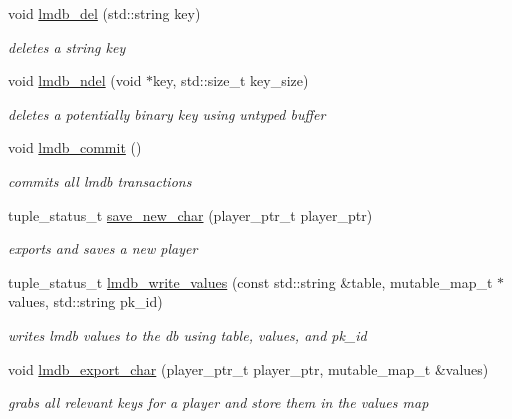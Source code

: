 \begin{DoxyCompactItemize}
void \hyperlink{namespacemods_1_1db_a5fbce517ac53231aa35c7d9c58622ce2}{lmdb\+\_\+del} (std\+::string key)
\begin{DoxyCompactList}\small\item\em deletes a string key \end{DoxyCompactList}\item 
void \hyperlink{namespacemods_1_1db_af13cbeaf36d1892265aca37289d5c7cc}{lmdb\+\_\+ndel} (void $\ast$key, std\+::size\+\_\+t key\+\_\+size)
\begin{DoxyCompactList}\small\item\em deletes a potentially binary key using untyped buffer \end{DoxyCompactList}\item 
\mbox{\label{namespacemods_1_1db_a2ecd0fbb4254d5de7539205ae7b97f8a}} 
void \hyperlink{namespacemods_1_1db_a2ecd0fbb4254d5de7539205ae7b97f8a}{lmdb\+\_\+commit} ()
\begin{DoxyCompactList}\small\item\em commits all lmdb transactions \end{DoxyCompactList}\item 
tuple\+\_\+status\+\_\+t \hyperlink{namespacemods_1_1db_a8bccbc433ca6a53482a62f5181230d9b}{save\+\_\+new\+\_\+char} (player\+\_\+ptr\+\_\+t player\+\_\+ptr)
\begin{DoxyCompactList}\small\item\em exports and saves a new player \end{DoxyCompactList}\item 
tuple\+\_\+status\+\_\+t \hyperlink{namespacemods_1_1db_a1679c965eb39cf4c1c28f9670c4dbd26}{lmdb\+\_\+write\+\_\+values} (const std\+::string \&table, mutable\+\_\+map\+\_\+t $\ast$values, std\+::string pk\+\_\+id)
\begin{DoxyCompactList}\small\item\em writes lmdb values to the db using table, values, and pk\+\_\+id \end{DoxyCompactList}\item 
void \hyperlink{namespacemods_1_1db_a2cb0a00d3700b5eab314405d909a8cce}{lmdb\+\_\+export\+\_\+char} (player\+\_\+ptr\+\_\+t player\+\_\+ptr, mutable\+\_\+map\+\_\+t \&values)
\begin{DoxyCompactList}\small\item\em grabs all relevant keys for a player and store them in the values map \end{DoxyCompactList}\item 

\end{DoxyCompactItemize}
